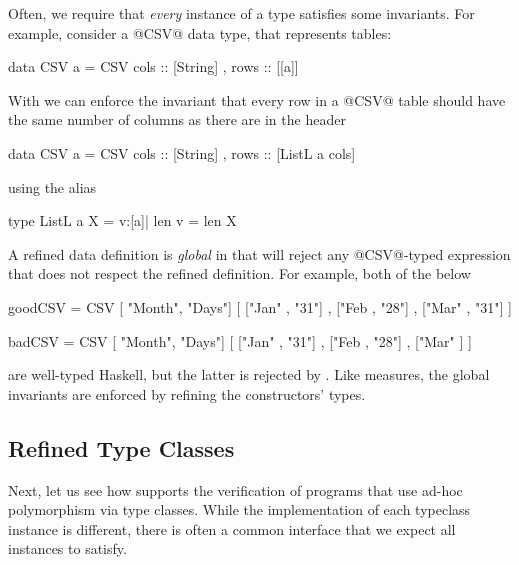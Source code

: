 Often, we require that \emph{every} instance of a type satisfies some invariants. 
For example, consider a @CSV@ data type, that represents tables:
%
\begin{code}
  data CSV a = CSV { cols :: [String]
                   , rows :: [[a]]    }
\end{code}
%
With \toolname we can enforce the invariant that every row in a @CSV@ table
should have the same number of columns as there are in the header
%
\begin{code}
  data CSV a = CSV { cols :: [String]  
                   , rows :: [ListL a cols] }
\end{code}
%
using the alias
%
\begin{code}
  type ListL a X = {v:[a]| len v = len X}
\end{code}
%
A refined data definition is \emph{global} in that \toolname 
will reject any @CSV@-typed expression that does not respect 
the refined definition. For example, both of the below 
%
\begin{code}
  goodCSV = CSV [  "Month", "Days"] 
                [ ["Jan"  , "31"]
                , ["Feb   , "28"]
                , ["Mar"  , "31"] ]

  badCSV  = CSV [  "Month", "Days"] 
                [ ["Jan"  , "31"]
                , ["Feb   , "28"]
                , ["Mar"        ] ]
\end{code}
%
are well-typed Haskell, but the latter is rejected by \toolname.
%
Like measures, the global invariants are enforced by refining 
the constructors' types. 

\subsection{Refined Type Classes}\label{sec:type-classes}

Next, let us see how \toolname supports the verification of
programs that use ad-hoc polymorphism via type classes.
%
While the implementation of each typeclass instance is 
different, there is often a common interface that we 
expect all instances to satisfy.

